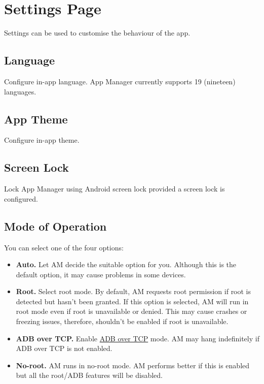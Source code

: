 \section{Settings Page}\label{sec:settings-page} %
Settings can be used to customise the behaviour of the app.

\subsection{Language}\label{subsec:language} %
Configure in-app language.
App Manager currently supports 19 (nineteen) languages.

\subsection{App Theme}\label{subsec:app-theme} %
Configure in-app theme.

\subsection{Screen Lock}\label{subsec:screen-lock} %
Lock App Manager using Android screen lock provided a screen lock is configured.

\subsection{Mode of Operation}\label{subsec:mode-of-operation} %
You can select one of the four options:
\begin{itemize}
    \item \textbf{Auto.} Let AM decide the suitable option for you.
    Although this is the default option, it may cause problems in some devices.

    \item \textbf{Root.} Select root mode.
    By default, AM requests root permission if root is detected but hasn't been granted.
    If this option is selected, AM will run in root mode even if root is unavailable or denied.
    This may cause crashes or freezing issues, therefore, shouldn't be enabled if root is unavailable.

    \item \textbf{ADB over TCP.} Enable \hyperref[sec:adb-over-tcp]{ADB over TCP} mode.
    AM may hang indefinitely if ADB over TCP is not enabled.

    \item \textbf{No-root.} AM runs in no-root mode.
    AM performs better if this is enabled but all the root/ADB features will be disabled.
\end{itemize}

